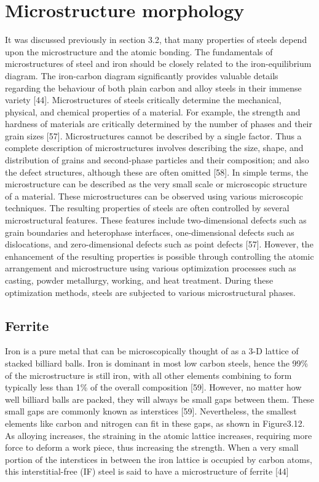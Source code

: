 \documentclass[12pt]{report}
\begin{document}
\section{Microstructure morphology} 
It was discussed previously in section 3.2, that many properties of steels depend upon the microstructure and the atomic bonding. The fundamentals of microstructures of steel and iron should be closely related to the iron-equilibrium diagram. The iron-carbon diagram significantly provides valuable details regarding the behaviour of both plain carbon and alloy steels in their immense variety [44]. 
Microstructures of steels critically determine the mechanical, physical, and chemical properties of a material. For example, the strength and hardness of materials are critically determined by the number of phases and their grain sizes [57]. Microstructures cannot be described by a single factor. Thus a complete description of microstructures involves describing the size, shape, and distribution of grains and second-phase particles and their composition; and also the defect structures, although these are often omitted [58]. In simple terms, the microstructure can be described as the very small scale or microscopic structure of a material. These microstructures can be observed using various microscopic techniques.  
The resulting properties of steels are often controlled by several microstructural features. These features include two-dimensional defects such as grain boundaries and heterophase interfaces, one-dimensional defects such as dislocations, and zero-dimensional defects such as point defects [57]. However, the enhancement of the resulting properties is possible through controlling the atomic arrangement and microstructure using various optimization processes such as casting, powder metallurgy, working, and heat treatment. During these optimization methods, steels are subjected to various microstructural phases.

\subsection{Ferrite} 
Iron is a pure metal that can be microscopically thought of as a 3-D lattice of stacked billiard balls. Iron is dominant in most low carbon steels, hence the 99\% of the microstructure is still iron, with all other elements combining to form typically less than 1\% of the overall composition [59]. However, no matter how well billiard balls are packed, they will always be small gaps between them. These small gaps are commonly known as interstices [59]. Nevertheless, the smallest elements like carbon and nitrogen can fit in these gaps, as shown in Figure3.12. As alloying increases, the straining in the atomic lattice increases, requiring more force to deform a work piece, thus increasing the strength. When a very small portion of the interstices in between the iron lattice is occupied by carbon atoms, this interstitial-free (IF) steel is said to have a microstructure of ferrite [44]
 
\end{document}
